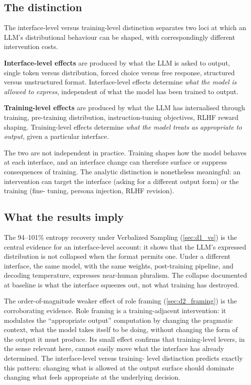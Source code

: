 \subsection{The distinction}
\label{sec:disc_distinction}

The interface-level versus training-level distinction separates two
loci at which an LLM's distributional behaviour can be shaped, with
correspondingly different intervention costs.

\textbf{Interface-level effects} are produced by what the LLM is
asked to output, single token versus distribution, forced choice
versus free response, structured versus unstructured format.
Interface-level effects determine \emph{what the model is allowed to
express}, independent of what the model has been trained to output.

\textbf{Training-level effects} are produced by what the LLM has
internalised through training, pre-training distribution,
instruction-tuning objectives, RLHF reward shaping. Training-level
effects determine \emph{what the model treats as appropriate to
output}, given a particular interface.

The two are not independent in practice. Training shapes how the
model behaves at each interface, and an interface change can therefore
surface or suppress consequences of training. The analytic
distinction is nonetheless meaningful: an intervention can target the
interface (asking for a different output form) or the training (fine-
tuning, persona injection, RLHF revision).

\subsection{What the results imply}
\label{sec:disc_implications}

The 94--101\% entropy recovery under Verbalized Sampling
(\cref{sec:d1_vs}) is the central evidence for an interface-level
account: it shows that the LLM's expressed distribution is not
collapsed when the format permits one. Under a different interface, the
same model, with the
same weights, post-training pipeline, and decoding temperature,
expresses near-human pluralism. The collapse documented at baseline is
what the interface squeezes out, not what training has destroyed.

The order-of-magnitude weaker effect of role framing
(\cref{sec:d2_framing}) is the corroborating evidence. Role framing is
a training-adjacent intervention: it modulates the ``appropriate
output'' computation by changing the pragmatic context, what the
model takes itself to be doing, without changing the form of the
output it must produce. Its small effect confirms that training-level
levers, in the sense relevant here, cannot easily move what the
interface has already determined. The interface-level versus training-
level distinction predicts exactly this pattern: changing what is
allowed at the output surface should dominate changing what feels
appropriate at the underlying decision.

